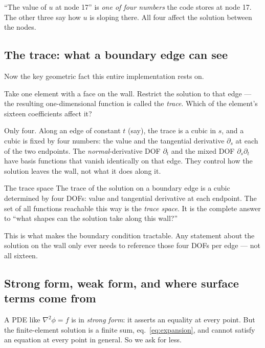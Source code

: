 \documentclass[11pt,a4paper]{article}
\begin{document}
\begin{plain}
``The value of $u$ at node 17'' is \emph{one of four numbers} the code stores at node 17. The other
three say how $u$ is sloping there. All four affect the solution between the nodes.
\end{plain}

\subsection{The trace: what a boundary edge can see}

Now the key geometric fact this entire implementation rests on.

Take one element with a face on the wall. Restrict the solution to that edge --- the resulting
one-dimensional function is called the \emph{trace}. Which of the element's sixteen coefficients
affect it?

Only four. Along an edge of constant $t$ (say), the trace is a cubic in $s$, and a cubic is fixed by
four numbers: the value and the tangential derivative $\partial_s$ at each of the two endpoints. The
\emph{normal}-derivative DOF $\partial_t$ and the mixed DOF $\partial_s\partial_t$ have basis
functions that vanish identically on that edge. They control how the solution leaves the wall, not
what it does along it.

\begin{concept}{The trace space}
The trace of the solution on a boundary edge is a cubic determined by four DOFs: value and
tangential derivative at each endpoint. The set of all functions reachable this way is the
\emph{trace space}. It is the complete answer to ``what shapes can the solution take along this
wall?''

This is what makes the boundary condition tractable. Any statement about the solution on the wall
only ever needs to reference those four DOFs per edge --- not all sixteen.
\end{concept}

\subsection{Strong form, weak form, and where surface terms come from}

A PDE like $\nabla^2\phi = f$ is in \emph{strong form}: it asserts an equality at every point. But
the finite-element solution is a finite sum, eq.~\eqref{eq:expansion}, and cannot satisfy an equation
at every point in general. So we ask for less.
\end{document}
